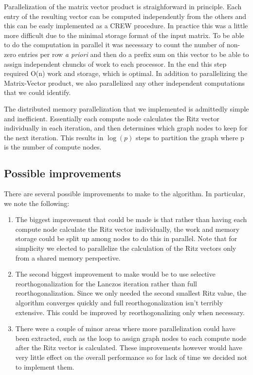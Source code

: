 \documentclass[11pt, oneside]{article}   	%
\begin{document}
Parallelization of the matrix vector product is straighforward in principle. Each entry of the resulting vector can be computed independently from the others and this can be easly implemented as a CREW procedure. In practice this was a little more difficult due to the minimal storage format of the input matrix. To be able to do the computation in parallel it was necessary to count the number of non-zero entries per row \emph{a priori} and then do a prefix sum on this vector to be able to assign independent chuncks of work to each processor. In the end this step required O(n) work and storage, which is optimal. In addition to parallelizing the Matrix-Vector product, we also parallelized any other independent computations that we could identify.

The distributed memory parallelization that we implemented is admittedly simple and inefficient. Essentially each compute node calculates the Ritz vector individually in each iteration, and then determines which graph nodes to keep for the next iteration. This results in $\log(p)$ steps to partition the graph where p is the number of compute nodes.

\subsection{Possible improvements}
There are several possible improvements to make to the algorithm. In particular, we note the following:

\begin{enumerate}
	\item The biggest improvement that could be made is that rather than having each compute node calculate the Ritz vector individually, the work and memory storage could be split up among nodes to do this in parallel.  Note that for simplicity we elected to parallelize the calculation of the Ritz vectors only from a shared memory perspective.

	\item The second biggest improvement to make would be to use selective reorthogonalization for the Lanczos iteration rather than full reorthogonalization. Since we only needed the second smallest Ritz value, the algorithm converges quickly and full reorthogonalization isn't terribly extensive. This could be improved by reorthogonalizing only when necessary.

	\item There were a couple of minor areas where more parallelization could have been extracted, such as the loop to assign graph nodes to each compute node after the Ritz vector is calculated. These improvements however would have very little effect on the overall performance so for lack of time we decided not to implement them.
\end{enumerate}
\end{document}
